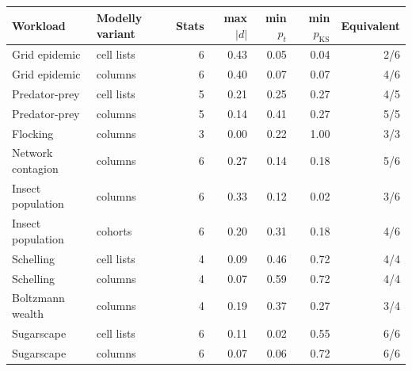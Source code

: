 \begin{tabular}{llrrrrr}
\toprule
Workload & Modelly variant & Stats & max $|d|$ & min $p_{t}$ & min $p_{\mathrm{KS}}$ & Equivalent \\
\midrule
Grid epidemic & cell lists & 6 & 0.43 & 0.05 & 0.04 & 2/6 \\
Grid epidemic & columns & 6 & 0.40 & 0.07 & 0.07 & 4/6 \\
Predator-prey & cell lists & 5 & 0.21 & 0.25 & 0.27 & 4/5 \\
Predator-prey & columns & 5 & 0.14 & 0.41 & 0.27 & 5/5 \\
Flocking & columns & 3 & 0.00 & 0.22 & 1.00 & 3/3 \\
Network contagion & columns & 6 & 0.27 & 0.14 & 0.18 & 5/6 \\
Insect population & columns & 6 & 0.33 & 0.12 & 0.02 & 3/6 \\
Insect population & cohorts & 6 & 0.20 & 0.31 & 0.18 & 4/6 \\
Schelling & cell lists & 4 & 0.09 & 0.46 & 0.72 & 4/4 \\
Schelling & columns & 4 & 0.07 & 0.59 & 0.72 & 4/4 \\
Boltzmann wealth & columns & 4 & 0.19 & 0.37 & 0.27 & 3/4 \\
Sugarscape & cell lists & 6 & 0.11 & 0.02 & 0.55 & 6/6 \\
Sugarscape & columns & 6 & 0.07 & 0.06 & 0.72 & 6/6 \\
\bottomrule
\end{tabular}
